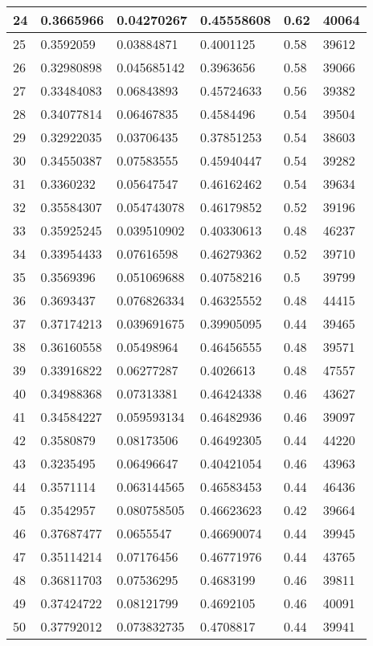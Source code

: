 \begin{longtable}{|l|l|l|l|l|l|}
24 & 0.3665966 & 0.04270267 & 0.45558608 & 0.62 & 40064 \\ \hline 
25 & 0.3592059 & 0.03884871 & 0.4001125 & 0.58 & 39612 \\ \hline 
26 & 0.32980898 & 0.045685142 & 0.3963656 & 0.58 & 39066 \\ \hline 
27 & 0.33484083 & 0.06843893 & 0.45724633 & 0.56 & 39382 \\ \hline 
28 & 0.34077814 & 0.06467835 & 0.4584496 & 0.54 & 39504 \\ \hline 
29 & 0.32922035 & 0.03706435 & 0.37851253 & 0.54 & 38603 \\ \hline 
30 & 0.34550387 & 0.07583555 & 0.45940447 & 0.54 & 39282 \\ \hline 
31 & 0.3360232 & 0.05647547 & 0.46162462 & 0.54 & 39634 \\ \hline 
32 & 0.35584307 & 0.054743078 & 0.46179852 & 0.52 & 39196 \\ \hline 
33 & 0.35925245 & 0.039510902 & 0.40330613 & 0.48 & 46237 \\ \hline 
34 & 0.33954433 & 0.07616598 & 0.46279362 & 0.52 & 39710 \\ \hline 
35 & 0.3569396 & 0.051069688 & 0.40758216 & 0.5 & 39799 \\ \hline 
36 & 0.3693437 & 0.076826334 & 0.46325552 & 0.48 & 44415 \\ \hline 
37 & 0.37174213 & 0.039691675 & 0.39905095 & 0.44 & 39465 \\ \hline 
38 & 0.36160558 & 0.05498964 & 0.46456555 & 0.48 & 39571 \\ \hline 
39 & 0.33916822 & 0.06277287 & 0.4026613 & 0.48 & 47557 \\ \hline 
40 & 0.34988368 & 0.07313381 & 0.46424338 & 0.46 & 43627 \\ \hline 
41 & 0.34584227 & 0.059593134 & 0.46482936 & 0.46 & 39097 \\ \hline 
42 & 0.3580879 & 0.08173506 & 0.46492305 & 0.44 & 44220 \\ \hline 
43 & 0.3235495 & 0.06496647 & 0.40421054 & 0.46 & 43963 \\ \hline 
44 & 0.3571114 & 0.063144565 & 0.46583453 & 0.44 & 46436 \\ \hline 
45 & 0.3542957 & 0.080758505 & 0.46623623 & 0.42 & 39664 \\ \hline 
46 & 0.37687477 & 0.0655547 & 0.46690074 & 0.44 & 39945 \\ \hline 
47 & 0.35114214 & 0.07176456 & 0.46771976 & 0.44 & 43765 \\ \hline 
48 & 0.36811703 & 0.07536295 & 0.4683199 & 0.46 & 39811 \\ \hline 
49 & 0.37424722 & 0.08121799 & 0.4692105 & 0.46 & 40091 \\ \hline 
50 & 0.37792012 & 0.073832735 & 0.4708817 & 0.44 & 39941 \\ \hline 
\end{longtable}